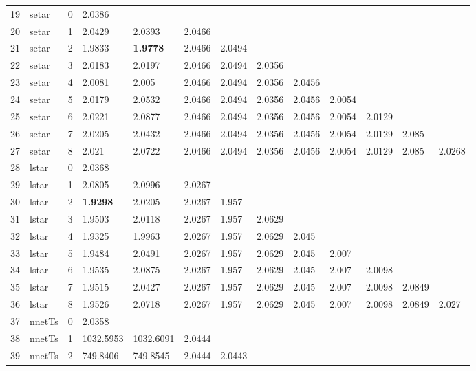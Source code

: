 \documentclass[10pt,a4paper]{article}
\begin{document}
\begin{table}[ht]
\begin{tabular}{rlrllllllllll}
   \hline
19 & setar &     0 & 2.0386 &  &  &  &  &  &  &  &  &  \\ 
  20 & setar &     1 & 2.0429 & 2.0393 & 2.0466 &  &  &  &  &  &  &  \\ 
  21 & setar &     2 & 1.9833 & \textbf{1.9778} & 2.0466 & 2.0494 &  &  &  &  &  &  \\ 
  22 & setar &     3 & 2.0183 & 2.0197 & 2.0466 & 2.0494 & 2.0356 &  &  &  &  &  \\ 
  23 & setar &     4 & 2.0081 & 2.005 & 2.0466 & 2.0494 & 2.0356 & 2.0456 &  &  &  &  \\ 
  24 & setar &     5 & 2.0179 & 2.0532 & 2.0466 & 2.0494 & 2.0356 & 2.0456 & 2.0054 &  &  &  \\ 
  25 & setar &     6 & 2.0221 & 2.0877 & 2.0466 & 2.0494 & 2.0356 & 2.0456 & 2.0054 & 2.0129 &  &  \\ 
  26 & setar &     7 & 2.0205 & 2.0432 & 2.0466 & 2.0494 & 2.0356 & 2.0456 & 2.0054 & 2.0129 & 2.085 &  \\ 
  27 & setar &     8 & 2.021 & 2.0722 & 2.0466 & 2.0494 & 2.0356 & 2.0456 & 2.0054 & 2.0129 & 2.085 & 2.0268 \\ 
   \hline
28 & lstar &     0 & 2.0368 &  &  &  &  &  &  &  &  &  \\ 
  29 & lstar &     1 & 2.0805 & 2.0996 & 2.0267 &  &  &  &  &  &  &  \\ 
  30 & lstar &     2 & \textbf{1.9298} & 2.0205 & 2.0267 & 1.957 &  &  &  &  &  &  \\ 
  31 & lstar &     3 & 1.9503 & 2.0118 & 2.0267 & 1.957 & 2.0629 &  &  &  &  &  \\ 
  32 & lstar &     4 & 1.9325 & 1.9963 & 2.0267 & 1.957 & 2.0629 & 2.045 &  &  &  &  \\ 
  33 & lstar &     5 & 1.9484 & 2.0491 & 2.0267 & 1.957 & 2.0629 & 2.045 & 2.007 &  &  &  \\ 
  34 & lstar &     6 & 1.9535 & 2.0875 & 2.0267 & 1.957 & 2.0629 & 2.045 & 2.007 & 2.0098 &  &  \\ 
  35 & lstar &     7 & 1.9515 & 2.0427 & 2.0267 & 1.957 & 2.0629 & 2.045 & 2.007 & 2.0098 & 2.0849 &  \\ 
  36 & lstar &     8 & 1.9526 & 2.0718 & 2.0267 & 1.957 & 2.0629 & 2.045 & 2.007 & 2.0098 & 2.0849 & 2.027 \\ 
   \hline
37 & nnetTs &     0 & 2.0358 &  &  &  &  &  &  &  &  &  \\ 
  38 & nnetTs &     1 & 1032.5953 & 1032.6091 & 2.0444 &  &  &  &  &  &  &  \\ 
  39 & nnetTs &     2 & 749.8406 & 749.8545 & 2.0444 & 2.0443 &  &  &  &  &  &  \\ 

\end{tabular}
\end{table}
\end{document}
